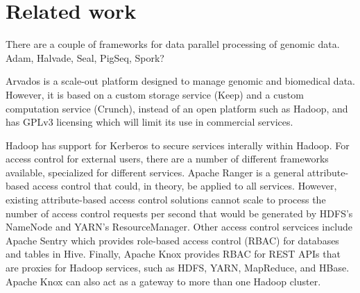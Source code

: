 \section{Related work}
There are a couple of frameworks for data parallel processing of genomic data. Adam, Halvade, Seal, PigSeq, Spork?

Arvados is a scale-out platform designed to manage genomic and biomedical data. However, it is based on a custom storage service (Keep) and a custom computation service (Crunch), instead of an open platform such as Hadoop, and has GPLv3 licensing which will limit its use in commercial services.

Hadoop has support for Kerberos to secure services interally within Hadoop. For access control for external users, there are a number of different frameworks available, specialized for different services. Apache Ranger is a general attribute-based access control that could, in theory, be applied to all services. However, existing attribute-based access control solutions cannot scale to process the number of access control requests per second that would be generated by HDFS's NameNode and YARN's ResourceManager. Other access control servcices include Apache Sentry which provides role-based access control (RBAC) for databases and tables in Hive. Finally, Apache Knox provides RBAC for REST APIs that are proxies for Hadoop services, such as HDFS, YARN, MapReduce, and HBase. Apache Knox can also act as a gateway to more than one Hadoop cluster.
